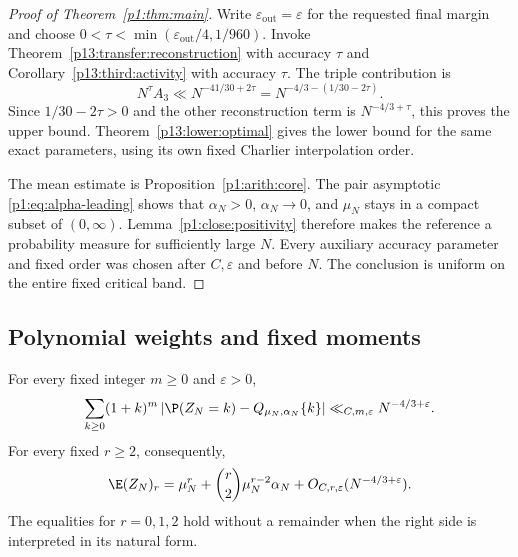 \begin{proof}[Proof of Theorem~\ref{p1:thm:main}]
Write $\varepsilon_{\mathrm{out}}=\varepsilon$ for the requested
final margin and choose
$0<\tau<\min(\varepsilon_{\mathrm{out}}/4,1/960)$.
Invoke Theorem~\ref{p13:transfer:reconstruction} with accuracy $\tau$
and Corollary~\ref{p13:third:activity} with accuracy $\tau$.
The triple contribution is
\[
 N^\tau A_3\ll N^{-41/30+2\tau}
       =N^{-4/3-(1/30-2\tau)}.
\]
Since $1/30-2\tau>0$ and the other reconstruction term is
$N^{-4/3+\tau}$, this proves the upper bound.
Theorem~\ref{p13:lower:optimal} gives the lower bound for the same
exact parameters, using its own fixed Charlier interpolation order.

The mean estimate is Proposition~\ref{p1:arith:core}.
The pair asymptotic \eqref{p1:eq:alpha-leading} shows
that \(\alpha_N>0\), \(\alpha_N\to0\), and \(\mu_N\)
stays in a compact subset of \((0,\infty)\).
Lemma~\ref{p1:close:positivity} therefore makes the
reference a probability measure for sufficiently large \(N\).
Every auxiliary accuracy parameter and fixed order was chosen after
\(C,\varepsilon\) and before \(N\). The conclusion
is uniform on the entire fixed critical band.
\end{proof}

\subsection{Polynomial weights and fixed moments}

\begin{corollary}
\label{p13:optimal:weighted}
For every fixed integer \(m\ge0\) and \(\varepsilon>0\),
\begin{equation}
 \sum_{k\ge0}(1+k)^m
   \left|\P(Z_N=k)-Q_{\mu_N,\alpha_N}\{k\}\right|
       \ll_{C,m,\varepsilon}N^{-4/3+\varepsilon}.
 \label{p13:optimal:weighted-bound}
\end{equation}
For every fixed \(r\ge2\), consequently,
\begin{equation}
 \E(Z_N)_r
 =\mu_N^r+\binom r2\mu_N^{r-2}\alpha_N
           +O_{C,r,\varepsilon}(N^{-4/3+\varepsilon}).
 \label{p13:optimal:moments}
\end{equation}
The equalities for \(r=0,1,2\) hold without a remainder
when the right side is interpreted in its natural form.
\end{corollary}


